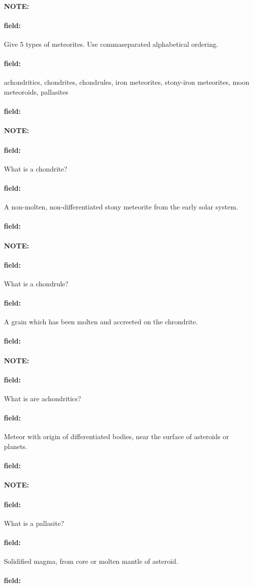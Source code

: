 \documentclass[12pt]{article}
\newenvironment{note}{\paragraph{NOTE:}}{}
\newenvironment{field}{\paragraph{field:}}{}
\begin{document}
\begin{note}
   \begin{field}
       Give 5 types of meteorites. Use commaseparated alphabetical ordering.
   \end{field}
   \begin{field}
		achondritics, chondrites, chondrules, iron meteorites, stony-iron meteorites, moon meteoroids, pallasites
   \end{field}
   \begin{field}
   \end{field}
\end{note}


\begin{note}
   \begin{field}
       What is a chondrite?
   \end{field}
   \begin{field}
		A non-molten, non-differentiated stony meteorite from the early solar system.
   \end{field}
   \begin{field}
   \end{field}
\end{note}
\begin{note}
   \begin{field}
       What is a chondrule?
   \end{field}
   \begin{field}
		A grain which has been molten and accreeted on the chrondrite.
   \end{field}
   \begin{field}
   \end{field}
\end{note}
\begin{note}
   \begin{field}
       What is are achondritics?
   \end{field}
   \begin{field}
		Meteor with origin of differentiated bodies, near the surface of asteroids or planets.
   \end{field}
   \begin{field}
   \end{field}
\end{note}
\begin{note}
   \begin{field}
       What is a pallasite?
   \end{field}
   \begin{field}
		Solidified magma, from core or molten mantle of asteroid.
   \end{field}
   \begin{field}
   \end{field}
\end{note}
\end{document}
